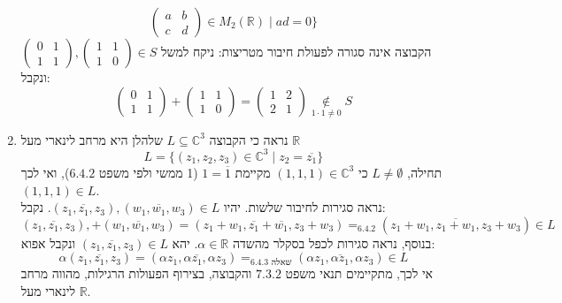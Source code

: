 \documentclass{article}
\newcommand\underrel[2]{\mathrel{\mathop{#2}\limits_{#1}}}
\DeclareMathOperator*{\equals}{=}
\begin{document}
\begin{enumerate}[i]
\[\begin{pmatrix}
                  a & b \\
                  c & d
              \end{pmatrix} \in M_2(\mathbb{R}) \; | \;
              ad=0   \}
          \]
          הקבוצה אינה סגורה לפעולת חיבור מטריצות: ניקח למשל $\begin{pmatrix}
                  0 & 1 \\
                  1 & 1
              \end{pmatrix}, \begin{pmatrix}
                  1 & 1 \\
                  1 & 0
              \end{pmatrix} \in S$ ונקבל:
          \[
              \begin{pmatrix}
                  0 & 1 \\
                  1 & 1
              \end{pmatrix} + \begin{pmatrix}
                  1 & 1 \\
                  1 & 0
              \end{pmatrix} = \begin{pmatrix}
                  1 & 2 \\
                  2 & 1
              \end{pmatrix}
              \underrel{1\cdot 1 \ne 0}{\notin} S
          \]
    \item נראה כי הקבוצה $L\subseteq \mathbb{C}^3$ שלהלן היא מרחב לינארי מעל $\mathbb{R}$
          \[
              L = \{(z_1,z_2,z_3)\in \mathbb{C}^3 \; | \; z_2 = \overline{z_1}\}
          \]
          תחילה, $L\ne \emptyset$
          כי $(1,1,1)\in \mathbb{C}^3$ מקיימת $1=\overline{1}$ (1 ממשי ולפי משפט $6.4.2$),
          ואי לכך $(1,1,1)\in L$. \\
          נראה סגירות לחיבור שלשות. יהיו $(z_1,\overline{z_1}, z_3), (w_1, \overline{w_1}, w_3)\in L$. נקבל:
          \[
              (z_1,\overline{z_1}, z_3),+ (w_1, \overline{w_1}, w_3) =
              (z_1+w_1, \overline{z_1}+\overline{w_1}, z_3+w_3) \equals_{6.4.2}
              (z_1+w_1, \overline{z_1+w_1}, z_3+w_3)\in L
          \]
          בנוסף, נראה סגירות לכפל בסקלר מהשדה $\alpha \in \mathbb{R}$. יהא $(z_1, \overline{z_1}, z_3)\in L$ ונקבל אפוא:
          \[
              \alpha (z_1, \overline{z_1}, z_3) =
              (\alpha z_1, \alpha \overline{z_1}, \alpha z_3) \equals_{\text{שאלה 6.4.3} }
              (\alpha z_1, \overline{\alpha z_1}, \alpha z_3) \in L
          \]
          אי לכך, מתקיימים תנאי משפט $7.3.2$ והקבוצה, בצירוף הפעולות הרגילות, מהווה מרחב לינארי מעל $\mathbb{R}$.
\end{enumerate}
\end{document}
